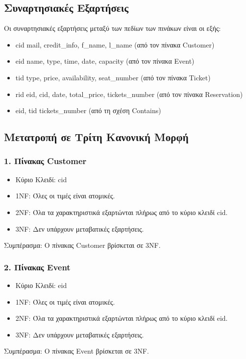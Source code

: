 \documentclass{article}
\begin{document}
\subsection*{Συναρτησιακές Εξαρτήσεις}
Οι συναρτησιακές εξαρτήσεις μεταξύ των πεδίων των πινάκων είναι οι εξής:
\begin{itemize}
    \item cid \rightarrow mail, credit\_info, f\_name, l\_name (από τον πίνακα Customer)
    \item eid \rightarrow name, type, time, date, capacity (από τον πίνακα Event)
    \item tid \rightarrow type, price, availability, seat\_number (από τον πίνακα Ticket)
    \item rid \rightarrow eid, cid, date, total\_price, tickets\_number (από τον πίνακα Reservation)
    \item eid, tid \rightarrow tickets\_number (από τη σχέση Contains)
\end{itemize}

\subsection*{Μετατροπή σε Τρίτη Κανονική Μορφή}
\subsubsection*{1. Πίνακας Customer}
\begin{itemize}
    \item Κύριο Κλειδί: cid
    \item 1NF: Όλες οι τιμές είναι ατομικές.
    \item 2NF: Όλα τα χαρακτηριστικά εξαρτώνται πλήρως από το κύριο κλειδί cid.
    \item 3NF: Δεν υπάρχουν μεταβατικές εξαρτήσεις.
\end{itemize}
Συμπέρασμα: Ο πίνακας Customer βρίσκεται σε 3NF.

\subsubsection*{2. Πίνακας Event}
\begin{itemize}
    \item Κύριο Κλειδί: eid
    \item 1NF: Όλες οι τιμές είναι ατομικές.
    \item 2NF: Όλα τα χαρακτηριστικά εξαρτώνται πλήρως από το κύριο κλειδί eid.
    \item 3NF: Δεν υπάρχουν μεταβατικές εξαρτήσεις.
\end{itemize}
Συμπέρασμα: Ο πίνακας Event βρίσκεται σε 3NF.
\end{document}
